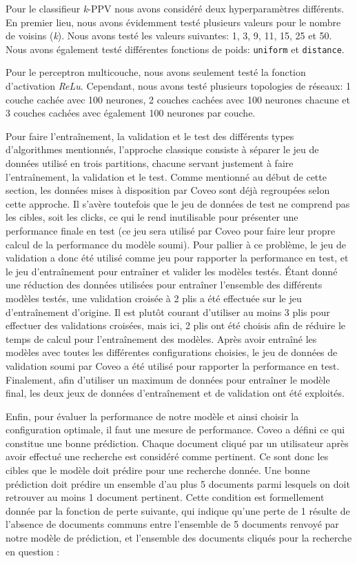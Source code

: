 Pour le classifieur \textit{k}-PPV nous avons considéré deux hyperparamètres différents. En premier lieu, nous avons évidemment testé plusieurs valeurs pour le nombre de voisins (\textit{k}). Nous avons testé les valeurs suivantes: 1, 3, 9, 11, 15, 25 et 50. 
Nous avons également testé différentes fonctions de poids: \texttt{uniform} et \texttt{distance}.

Pour le perceptron multicouche, nous avons seulement testé la fonction d'activation \textit{ReLu}. Cependant, nous avons testé plusieurs topologies de réseaux: 1 couche cachée avec 100 neurones, 2 couches cachées avec 100 neurones chacune et 3 couches cachées avec également 100 neurones par couche.
\break

Pour faire l'entraînement, la validation et le test des différents types d'algorithmes mentionnés, l'approche classique consiste à séparer le jeu de données utilisé en trois partitions, chacune servant justement à faire l'entraînement, la validation et le test. 
Comme mentionné au début de cette section, les données mises à disposition par Coveo sont déjà regroupées selon cette approche. 
Il s'avère toutefois que le jeu de données de test ne comprend pas les cibles, soit les clicks, ce qui le rend inutilisable pour présenter une performance finale en test (ce jeu sera utilisé par Coveo pour faire leur propre calcul de la performance du modèle soumi). 
Pour pallier à ce problème, le jeu de validation a donc été utilisé comme jeu pour rapporter la performance en test, et le jeu d'entraînement pour entraîner et valider les modèles testés. 
Étant donné une réduction des données utilisées pour entraîner l'ensemble des différents modèles testés, une validation croisée à 2 plis a été effectuée sur le jeu d'entraînement d'origine. Il est plutôt courant d'utiliser au moins 3 plis pour effectuer des validations croisées, mais ici, 2 plis ont été choisis afin de réduire le temps de calcul pour l'entraînement des modèles. 
Après avoir entraîné les modèles avec toutes les différentes configurations choisies, le jeu de données de validation soumi par Coveo a été utilisé pour rapporter la performance en test. Finalement, afin d'utiliser un maximum de données pour entraîner le modèle final, les deux jeux de données d'entraînement et de validation ont été exploités.
\break

Enfin, pour évaluer la performance de notre modèle et ainsi choisir la configuration optimale, il faut une mesure de performance. 
Coveo a défini ce qui constitue une bonne prédiction. 
Chaque document cliqué par un utilisateur après avoir effectué une recherche est considéré comme pertinent. Ce sont donc les cibles que le modèle doit prédire pour une recherche donnée. 
Une bonne prédiction doit prédire un ensemble d'au plus 5 documents parmi lesquels on doit retrouver au moins 1 document pertinent. Cette condition est formellement donnée par la fonction de perte suivante, qui indique qu'une perte de 1 résulte de l'absence de documents communs entre l'ensemble de 5 documents renvoyé par notre modèle de prédiction, et l'ensemble des documents cliqués pour la recherche en question :

